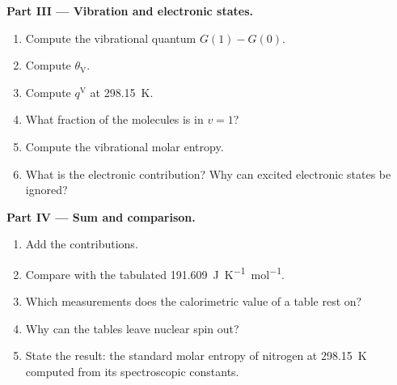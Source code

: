 \begin{problem}
\medskip\noindent\textbf{Part III --- Vibration and electronic states.}
\begin{enumerate}[resume]
  \item Compute the vibrational quantum $G(1) - G(0)$.
  \item Compute $\theta_{\mathrm V}$.
  \item Compute $q^{\mathrm V}$ at \qty{298.15}{K}.
  \item What fraction of the molecules is in $v = 1$?
  \item Compute the vibrational molar entropy.
  \item What is the electronic contribution? Why can excited electronic states
        be ignored?
\end{enumerate}

\medskip\noindent\textbf{Part IV --- Sum and comparison.}
\begin{enumerate}[resume]
  \item Add the contributions.
  \item Compare with the tabulated \qty{191.609}{J.K^{-1}.mol^{-1}}.
  \item Which measurements does the calorimetric value of a table rest on?
  \item Why can the tables leave nuclear spin out?
  \item State the result: the standard molar entropy of nitrogen at \qty{298.15}{K}
        computed from its spectroscopic constants.
\end{enumerate}
\end{problem}
